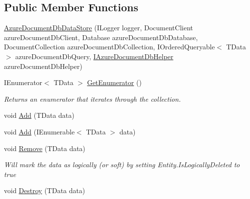 \subsection*{Public Member Functions}
\begin{DoxyCompactItemize}
\item 
\hyperlink{classCqrs_1_1Azure_1_1DocumentDb_1_1DataStores_1_1AzureDocumentDbDataStore_add3f66df634a9e9ca0cbd4498e4478f6_add3f66df634a9e9ca0cbd4498e4478f6}{Azure\+Document\+Db\+Data\+Store} (I\+Logger logger, Document\+Client azure\+Document\+Db\+Client, Database azure\+Document\+Db\+Database, Document\+Collection azure\+Document\+Db\+Collection, I\+Ordered\+Queryable$<$ T\+Data $>$ azure\+Document\+Db\+Query, \hyperlink{interfaceCqrs_1_1Azure_1_1DocumentDb_1_1IAzureDocumentDbHelper}{I\+Azure\+Document\+Db\+Helper} azure\+Document\+Db\+Helper)
\item 
I\+Enumerator$<$ T\+Data $>$ \hyperlink{classCqrs_1_1Azure_1_1DocumentDb_1_1DataStores_1_1AzureDocumentDbDataStore_af83791e306b51fd3ee0b710232e83756_af83791e306b51fd3ee0b710232e83756}{Get\+Enumerator} ()
\begin{DoxyCompactList}\small\item\em Returns an enumerator that iterates through the collection. \end{DoxyCompactList}\item 
void \hyperlink{classCqrs_1_1Azure_1_1DocumentDb_1_1DataStores_1_1AzureDocumentDbDataStore_ad17e6e846430e617af24be48b77d1528_ad17e6e846430e617af24be48b77d1528}{Add} (T\+Data data)
\item 
void \hyperlink{classCqrs_1_1Azure_1_1DocumentDb_1_1DataStores_1_1AzureDocumentDbDataStore_a2d91050f17273687e44a121623803e7a_a2d91050f17273687e44a121623803e7a}{Add} (I\+Enumerable$<$ T\+Data $>$ data)
\item 
void \hyperlink{classCqrs_1_1Azure_1_1DocumentDb_1_1DataStores_1_1AzureDocumentDbDataStore_abf9bcf75e8e0e1ec86155bf4da1a7b7a_abf9bcf75e8e0e1ec86155bf4da1a7b7a}{Remove} (T\+Data data)
\begin{DoxyCompactList}\small\item\em Will mark the {\itshape data}  as logically (or soft) by setting Entity.\+Is\+Logically\+Deleted to true \end{DoxyCompactList}\item 
void \hyperlink{classCqrs_1_1Azure_1_1DocumentDb_1_1DataStores_1_1AzureDocumentDbDataStore_affe39fe57e590555256258fa6c568c29_affe39fe57e590555256258fa6c568c29}{Destroy} (T\+Data data)
\item 

\end{DoxyCompactItemize}
